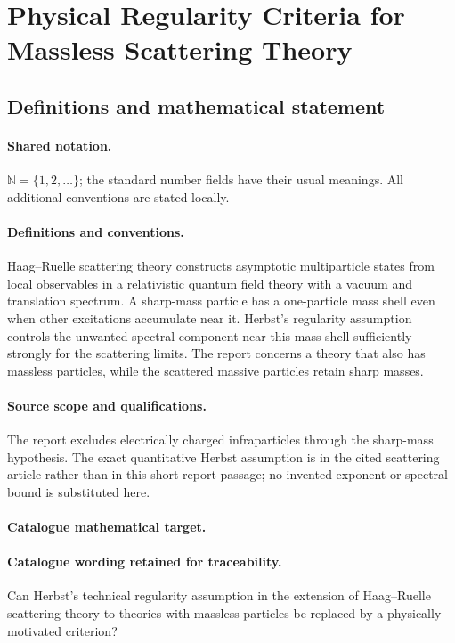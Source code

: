 \documentclass[11pt]{article}
\begin{document}
\section{Physical Regularity Criteria for Massless Scattering Theory}\label{statement}

\subsection{Definitions and mathematical statement}

\paragraph{Shared notation.}$\mathbb N=\{1,2,\ldots\}$; the standard number fields have their usual meanings. All additional conventions are stated locally.


\paragraph{Definitions and conventions.} Haag--Ruelle scattering theory constructs asymptotic multiparticle states from local observables in a relativistic quantum field theory with a vacuum and translation spectrum. A sharp-mass particle has a one-particle mass shell even when other excitations accumulate near it. Herbst's regularity assumption controls the unwanted spectral component near this mass shell sufficiently strongly for the scattering limits. The report concerns a theory that also has massless particles, while the scattered massive particles retain sharp masses.

\paragraph{Source scope and qualifications.} The report excludes electrically charged infraparticles through the sharp-mass hypothesis. The exact quantitative Herbst assumption is in the cited scattering article rather than in this short report passage; no invented exponent or spectral bound is substituted here.

\paragraph{Catalogue mathematical target.}
\paragraph{Catalogue wording retained for traceability.}
Can Herbst's technical regularity assumption in the extension of Haag–Ruelle scattering theory to theories with massless particles be replaced by a physically motivated criterion?
\end{document}
